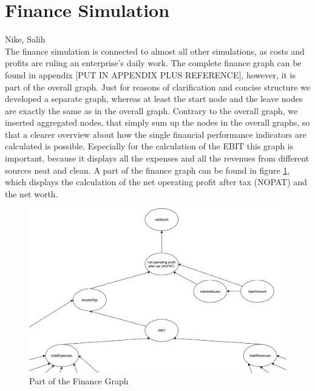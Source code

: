 \section{Finance Simulation}
\label{sec:finance_simulation}
Nike, Salih\\

The finance simulation is connected to almost all other simulations, as costs and profits are ruling an enterprise's daily work. The complete finance graph can be found in appendix [PUT IN APPENDIX PLUS REFERENCE], however, it is part of the overall graph. Just for reasons of clarification and concise structure we developed a separate graph, whereas at least the start node and the leave nodes are exactly the same as in the overall graph. Contrary to the overall graph, we inserted aggregated nodes, that simply sum up the nodes in the overall graphs, so that a clearer overview about how the single financial performance indicators are calculated is possible. Especially for the calculation of the EBIT this graph is important, because it displays all the expenses and all the revenues from different sources neat and clean. A part of the finance graph can be found in figure \ref{fig:financeGraphPart}, which displays the calculation of the net operating profit after tax (NOPAT) and the net worth.

\begin{figure} [!htbp]
    \centering
    \includegraphics [width=\textwidth] {images/FinanceGraphPart.png}
    \caption{Part of the Finance Graph}
    \label{fig:financeGraphPart}
\end{figure}

